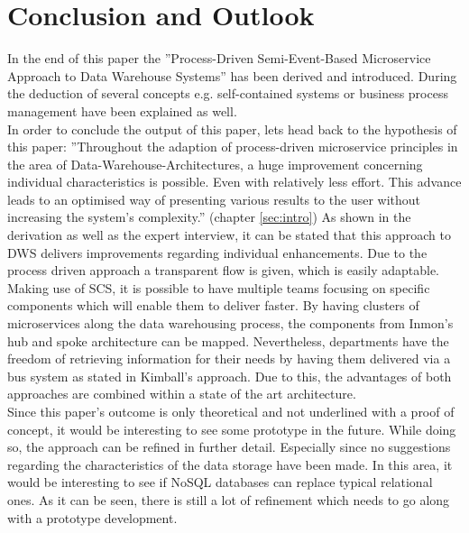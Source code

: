 \section{Conclusion and Outlook}
\label{sec:conclusion}
In the end of this paper the ''Process-Driven Semi-Event-Based Microservice Approach to Data Warehouse Systems'' has been derived and introduced. During the deduction of several concepts e.g. self-contained systems or business process management have been explained as well. \newline
\\
In order to conclude the output of this paper, lets head back to the hypothesis of this paper: ''Throughout the adaption of process-driven  microservice  principles  in  the  area  of  Data-Warehouse-Architectures,  a  huge improvement concerning individual characteristics is possible. Even with relatively less effort. This advance leads to an optimised way of presenting various results to the user without increasing the system's complexity.'' (chapter \ref{sec:intro})
As shown in the derivation as well as the expert interview, it can be stated that this approach to DWS delivers improvements regarding individual enhancements. Due to the process driven approach a transparent flow is given, which is easily adaptable. Making use of SCS, it is possible to have multiple teams focusing on specific components which will enable them to deliver faster. By having clusters of microservices along the data warehousing process, the components from Inmon's hub and spoke architecture can be mapped. Nevertheless, departments have the freedom of retrieving information for their needs by having them delivered via a bus system as stated in Kimball's approach.\newline
Due to this, the advantages of both approaches are combined within a state of the art architecture. \newline
\\
Since this paper's outcome is only theoretical and not underlined with a proof of concept, it would be interesting to see some prototype in the future. While doing so, the approach can be refined in further detail. Especially since no suggestions regarding the characteristics of the data storage have been made. In this area, it would be interesting to see if NoSQL databases can replace typical relational ones. As it can be seen, there is still a lot of refinement which needs to go along with a prototype development.
